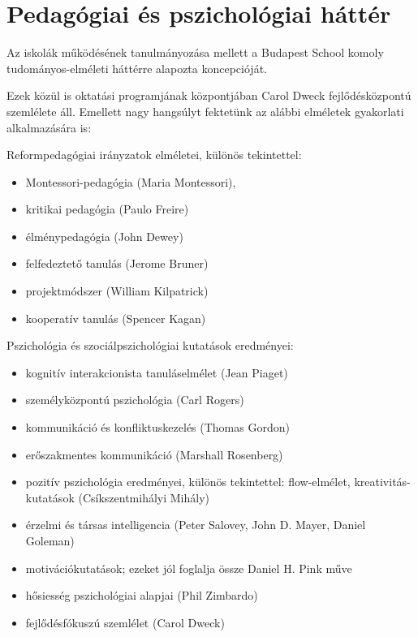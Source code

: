 \hypertarget{pedagogiai-es-pszichologiai-hatter}{%
\section{Pedagógiai és pszichológiai
háttér}\label{pedagogiai-es-pszichologiai-hatter}}

Az iskolák működésének tanulmányozása mellett a Budapest School komoly
tudományos-elméleti háttérre alapozta koncepcióját.

Ezek közül is oktatási programjának központjában
{Carol
Dweck fejlődésközpontú szemlélete} {\autocite{gerencser:18}}
áll. Emellett nagy hangsúlyt
fektetünk az alábbi elméletek gyakorlati alkalmazására is:

Reformpedagógiai irányzatok elméletei, különös tekintettel:

\begin{itemize}
\tightlist
\item
  Montessori-pedagógia (Maria Montessori),
\item
  kritikai pedagógia (Paulo Freire)
\item
  élménypedagógia (John Dewey)
\item
  felfedeztető tanulás (Jerome Bruner)
\item
  projektmódszer (William Kilpatrick)
\item
  kooperatív tanulás (Spencer Kagan)
\end{itemize}

Pszichológia és szociálpszichológiai kutatások eredményei:

\begin{itemize}
\tightlist
\item
  kognitív interakcionista tanuláselmélet (Jean Piaget)
\item
  személyközpontú pszichológia (Carl Rogers)
\item
  kommunikáció és konfliktuskezelés (Thomas Gordon)
\item
  erőszakmentes kommunikáció (Marshall Rosenberg)
\item
  pozitív pszichológia eredményei, különös tekintettel: flow-elmélet,
  kreativitás-kutatások (Csíkszentmihályi Mihály)
\item
  érzelmi és társas intelligencia (Peter Salovey, John D. Mayer, Daniel
  Goleman)
\item
  motivációkutatások; ezeket jól foglalja össze Daniel H. Pink műve
  {\autocite{Pink2011}}
\item
  hősiesség pszichológiai alapjai (Phil Zimbardo)
\item
  fejlődésfókuszú szemlélet (Carol Dweck)
\end{itemize}
